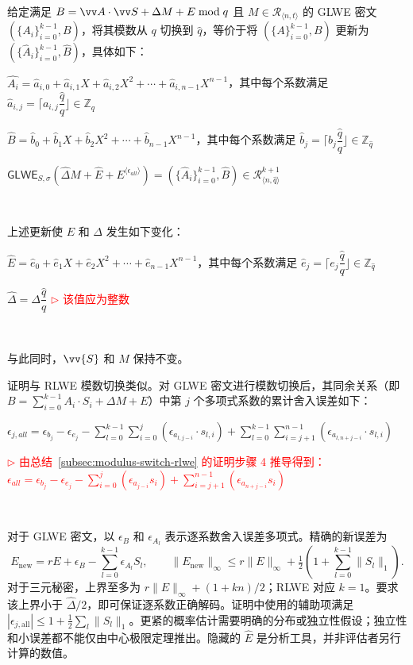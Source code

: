 \begin{tcolorbox}[title={\textbf{\tboxlabel{\ref*{subsec:modulus-switch-glwe}} GLWE 模数切换}}]

给定满足 $B = \vv A\cdot \vv S + \Delta M + E \bmod q$ 且 $M \in \mathcal{R}_{\langle n, t \rangle}$ 的 GLWE 密文 $(\{A_i\}_{i=0}^{k-1}, B)$，将其模数从 $q$ 切换到 $\hat q$，等价于将 $(\{A\}_{i=0}^{k-1}, B)$ 更新为 $(\{\hat{A}_i\}_{i=0}^{k-1}, \hat B)$，具体如下：


$\hat{A_i} = \hat{a}_{i,0} + \hat{a}_{i,1}X + \hat{a}_{i,2}X^2 + \cdots + \hat{a}_{i, {n-1}}X^{n-1}$，其中每个系数满足 $\hat{a}_{i,j} = \Big\lceil a_{i,j}\dfrac{\hat{q}}{q} \Big\rfloor \in \mathbb{Z}_{\hat{q}}$


$\hat{B} = \hat{b}_0 + \hat{b}_1X + \hat{b}_2X^2 + \cdots + \hat{b}_{n-1}X^{n-1}$，其中每个系数满足 $\hat{b}_j = \Big\lceil b_j\dfrac{\hat{q}}{q} \Big\rfloor \in \mathbb{Z}_{\hat{q}}$

$\textsf{GLWE}_{{S},\sigma}(\hat{\Delta}  M + \hat{E} + E^{\langle \epsilon_{\textit{all}} \rangle}) = (\{\hat{A}_i\}_{i=0}^{k-1}, \hat{B}) \in \mathcal{R}_{\langle n, \hat{q} \rangle}^{k+1}$ 

$ $

上述更新使 $E$ 和 $\Delta$ 发生如下变化：

$\hat{E} = \hat{e}_0 + \hat{e}_1X + \hat{e}_2X^2 + \cdots + \hat{e}_{n-1}X^{n-1}$，其中每个系数满足 $\hat{e}_j = \Big\lceil e_j\dfrac{\hat{q}}{q} \Big\rfloor \in \mathbb{Z}_{\hat{q}}$


$\hat{\Delta} = \Delta\dfrac{\hat{q}}{q}$ \textcolor{red}{ $\rhd$ 该值应为整数}

$ $


与此同时，$\vv{S}$ 和 $M$ 保持不变。



\end{tcolorbox}

证明与 RLWE 模数切换类似。对 GLWE 密文进行模数切换后，其同余关系（即 $B = \sum\limits_{i=0}^{k-1}A_i\cdot S_i + \Delta M + E$）中第 $j$ 个多项式系数的累计舍入误差如下：

$\epsilon_{j, all} = \epsilon_{b_j} - \epsilon_{e_j}
- \sum\limits_{l=0}^{k-1}\sum\limits_{i=0}^{j}(\epsilon_{a_{l,j-i}} \cdot s_{l,i})
+ \sum\limits_{l=0}^{k-1}\sum\limits_{i=j+1}^{n-1}(\epsilon_{a_{l,n+j-i}} \cdot s_{l,i})$

\textcolor{red}{ $\rhd$ 由总结~\ref*{subsec:modulus-switch-rlwe} 的证明步骤 4 推导得到：$\epsilon_{\textit{all}} = \epsilon_{b_j} - \epsilon_{e_j}
- \sum\limits_{i=0}^{j}(\epsilon_{a_{j-i}} s_i)
+ \sum\limits_{i=j+1}^{n-1}(\epsilon_{a_{n+j-i}} s_i)$}

$ $

对于 GLWE 密文，以 $\epsilon_B$ 和 $\epsilon_{A_l}$ 表示逐系数舍入误差多项式。精确的新误差为
\[
E_{\mathrm{new}}=rE+\epsilon_B-\sum_{l=0}^{k-1}\epsilon_{A_l}S_l,
\qquad
\|E_{\mathrm{new}}\|_\infty\le r\|E\|_\infty+\tfrac12\left(1+\sum_{l=0}^{k-1}\|S_l\|_1\right).
\]
对于三元秘密，上界至多为 $r\|E\|_\infty+(1+kn)/2$；RLWE 对应 $k=1$。要求该上界小于 $\hat\Delta/2$，即可保证逐系数正确解码。证明中使用的辅助项满足 $|\epsilon_{j,\mathrm{all}}|\le1+\frac12\sum_l\|S_l\|_1$。更紧的概率估计需要明确的分布或独立性假设；独立性和小误差都不能仅由中心极限定理推出。隐藏的 $\hat E$ 是分析工具，并非评估者另行计算的数值。